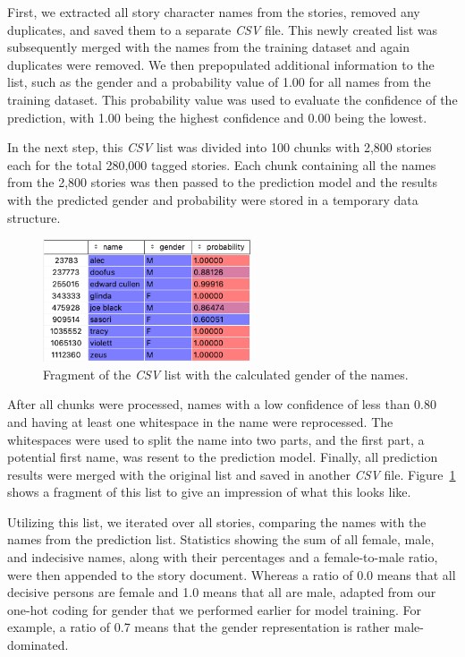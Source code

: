 First, we extracted all story character names from the stories, removed any duplicates, and saved them to a separate \emph{CSV} file.
This newly created list was subsequently merged with the names from the training dataset and again duplicates were removed.
We then prepopulated additional information to the list, such as the gender and a probability value of 1.00 for all names from the training dataset.
This probability value was used to evaluate the confidence of the prediction, with 1.00 being the highest confidence and 0.00 being the lowest.

In the next step, this \emph{CSV} list was divided into 100 chunks with 2,800 stories each for the total 280,000 tagged stories.
Each chunk containing all the names from the 2,800 stories was then passed to the prediction model and the results with the predicted gender and probability were stored in a temporary data structure.
\begin{figure}
    \centering
    \includegraphics[width=0.55\textwidth]{figures/predicted_names_excerpt}
    \caption[Fragment of the \emph{CSV} list with the calculated gender of the names.]{Fragment of the \emph{CSV} list with the calculated gender of the names.}
    \label{fig:predicted-names-excerpt}
\end{figure}
After all chunks were processed, names with a low confidence of less than 0.80 and having at least one whitespace in the name were reprocessed.
The whitespaces were used to split the name into two parts, and the first part, a potential first name, was resent to the prediction model.
Finally, all prediction results were merged with the original list and saved in another \emph{CSV} file.
Figure~\ref{fig:predicted-names-excerpt} shows a fragment of this list to give an impression of what this looks like.

Utilizing this list, we iterated over all stories, comparing the names with the names from the prediction list.
Statistics showing the sum of all female, male, and indecisive names, along with their percentages and a female-to-male ratio, were then appended to the story document.
Whereas a ratio of 0.0 means that all decisive persons are female and 1.0 means that all are male, adapted from our one-hot coding for gender that we performed earlier for model training.
For example, a ratio of 0.7 means that the gender representation is rather male-dominated.
